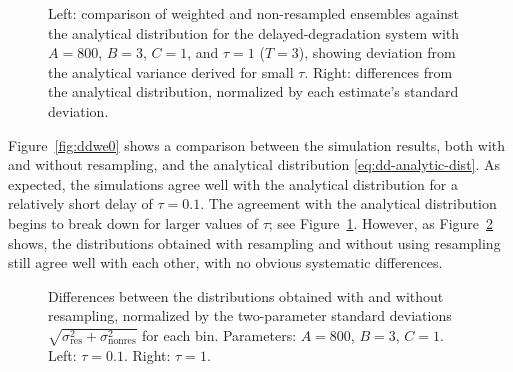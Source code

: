 \documentclass[english,letterpaper,12pt]{report}
\begin{document}
\begin{doublespacing}
\begin{figure}[tbp]
    \makebox[\linewidth][c]{
        \begin{subfigure}{3in}
            \begin{center}
                
            \end{center}
            \label{sfg:ddwe1-comp}
        \end{subfigure}
        \begin{subfigure}{3in}
            \begin{center}
                
            \end{center}
            \label{sfg:ddwe1-chi}
        \end{subfigure}
    }
    \caption{Left: comparison of weighted and non-resampled ensembles against the analytical distribution for the delayed-degradation system with $A=800$, $B=3$, $C=1$, and $\tau=1$ ($T=3$), showing deviation from the analytical variance derived for small $\tau$. Right: differences from the analytical distribution, normalized by each estimate's standard deviation.}
    \label{fig:ddwe1}
\end{figure}

Figure~\ref{fig:ddwe0} shows a comparison between the simulation results, both with and without resampling, and the analytical distribution \eqref{eq:dd-analytic-dist}. As expected, the simulations agree well with the analytical distribution for a relatively short delay of $\tau = 0.1$. The agreement with the analytical distribution begins to break down for larger values of $\tau$; see Figure~\ref{fig:ddwe1}. However, as Figure~\ref{fig:ddwe-resdevs} shows, the distributions obtained with resampling and without using resampling still agree well with each other, with no obvious systematic differences. 

\begin{figure}[tbp]
    \makebox[\linewidth][c]{
        \begin{subfigure}{3in}
            \begin{center}
                
            \end{center}
            \label{sfg:ddwe-resdevs0}
        \end{subfigure}
        \begin{subfigure}{3in}
            \begin{center}
                
            \end{center}
            \label{sfg:ddwe-resdevs1}
        \end{subfigure}
    }
    \caption{Differences between the distributions obtained with and without resampling, normalized by the two-parameter standard deviations $\sqrt{\sigma_\text{res}^2 + \sigma_\text{nonres}^2}$ for each bin. Parameters: $A=800$, $B=3$, $C=1$. Left: $\tau = 0.1$. Right: $\tau = 1$.}
    \label{fig:ddwe-resdevs}
\end{figure}


\end{doublespacing}
\end{document}
